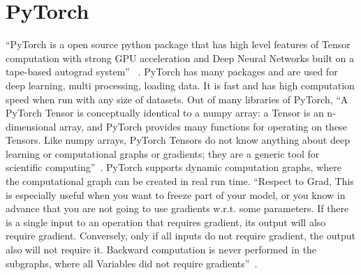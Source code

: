 \section{PyTorch}

``PyTorch is a open source python package that has high level features of 
Tensor computation with strong GPU acceleration and Deep 
Neural Networks built on a tape-based autograd system''
~\cite{hid-sp18-520-PyTorch}.
PyTorch has many packages and are used for deep learning, multi processing,
loading data. It is fast and has high computation speed when run with any size 
of datasets.
Out of many libraries of PyTorch, ``A PyTorch Tensor is conceptually identical 
to a numpy array: a Tensor is an n-dimensional array, and PyTorch provides many
functions for operating on these Tensors. Like numpy arrays, PyTorch Tensors do 
not know anything about deep learning or computational graphs or gradients; they
are a generic tool for scientific computing''~\cite{hid-sp18-520-PyTorchtensor}.
PyTorch supports dynamic computation graphs, where the computational graph can 
be created in real run time.
``Respect to Grad, This is especially useful when you want to freeze part of your
model, or you know in advance that you are not going to use gradients w.r.t. 
some parameters. If there is a single input to an operation that requires 
gradient, its output will also require gradient. Conversely, only if all inputs 
do not require gradient, the output also will not require it. Backward 
computation is never performed in the subgraphs, where all Variables did not 
require gradients''~\cite{hid-sp18-520-PyTorchgrad}.
